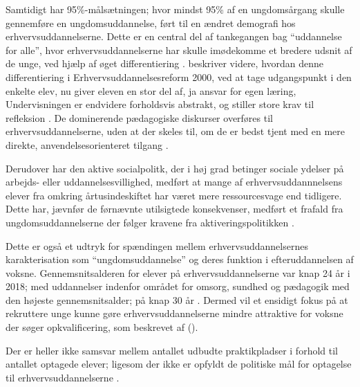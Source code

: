 Samtidigt har 95\%-målsætningen; hvor mindst 95\% af en ungdomsårgang skulle gennemføre en ungdomsuddannelse, ført til en ændret demografi hos erhvervsuddannelserne.
Dette er en central del af tankegangen bag “uddannelse for alle”, hvor erhvervsuddannelserne har skulle imødekomme et bredere udsnit af de unge, ved hjælp af øget differentiering \autocite[s. 365f]{aarkrogRummelighedOgSammenhaeng2003}.
\citeauthor{aarkrogRummelighedOgSammenhaeng2003} beskriver videre, hvordan denne differentiering i Erhvervsuddannelsesreform 2000, ved at tage udgangspunkt i den enkelte elev, nu giver eleven en  stor del af, ja ansvar for egen læring, Undervisningen er endvidere forholdsvis abstrakt, og stiller store krav til refleksion \citeyear[s. 367f]{aarkrogRummelighedOgSammenhaeng2003}.
De dominerende pædagogiske diskurser overføres til erhvervsuddannelserne, uden at der skeles til, om de er bedst tjent med en mere direkte, anvendelsesorienteret tilgang \autocite[s.
]{aarkrogRummelighedOgSammenhaeng2003}.

Derudover har den aktive socialpolitk, der i høj grad betinger sociale ydelser på arbejds- eller uddannelsesvillighed, medført at mange af erhvervsuddannnelsens elever fra omkring årtusindeskiftet har været mere ressourcesvage end tidligere.
Dette har, jævnfør de førnævnte utilsigtede konsekvenser, medført et frafald fra ungdomsuddannelserne der følger kravene fra aktiveringspolitikken \autocite[s.13]{jorgensenReformenAfErhvervsuddannelserne2016}.

Dette er også et udtryk for spændingen mellem erhvervsuddannelsernes karakterisation som “ungdomsuddannelse” og deres funktion i efteruddannelsen af voksne.
Gennemsnitsalderen for elever på erhvervsuddannelserne var knap 24 år i 2018; med uddannelser indenfor området for omsorg, sundhed og pædagogik med den højeste gennemsnitsalder; på knap 30 år \autocite[s. 14]{danmarksstatistikErhvervsuddannelserDanmark20192019}.
Dermed vil et ensidigt fokus på at rekruttere unge kunne gøre erhvervsuddannelserne mindre attraktive for voksne der søger opkvalificering, som beskrevet af \citeauthor{jorgensenReformenAfErhvervsuddannelserne2016} (\citeyear[s. 13]{jorgensenReformenAfErhvervsuddannelserne2016}).

Der er heller ikke samsvar mellem antallet udbudte praktikpladser i forhold til antallet optagede elever; ligesom der ikke er opfyldt de politiske mål for optagelse til erhvervsuddannelserne \autocite[s. 10]{danmarksstatistikErhvervsuddannelserDanmark20192019}.


